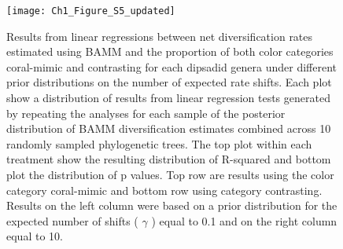 \begin{figure}[h]
	\centering
	\texttt{[image: Ch1\_Figure\_S5\_updated]}
	\caption[Results from linear regressions between net diversification rates estimated using BAMM and the proportion of both color categories coral-mimic and contrasting for each dipsadid genera under different prior distributions on the number of expected rate shifts.]{Results from linear regressions between net diversification rates estimated using BAMM and the proportion of both color categories coral-mimic and contrasting for each dipsadid genera under different prior distributions on the number of expected rate shifts. Each plot show a distribution of results from linear regression tests generated by repeating the analyses for each sample of the posterior distribution of BAMM diversification estimates combined across 10 randomly sampled phylogenetic trees. The top plot within each treatment show the resulting distribution of R-squared and bottom plot the distribution of p values. Top row are results using the color category coral-mimic and bottom row using category contrasting. Results on the left column were based on a prior distribution for the expected number of shifts ( $\gamma$ ) equal to 0.1 and on the right column equal to 10.}
	\label{fig:prior_linear_BAMM} %
\end{figure}
